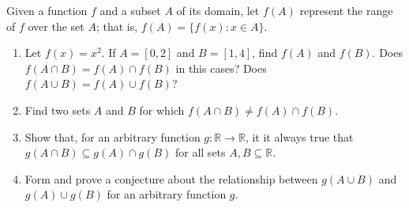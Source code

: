 \documentclass[class=understanding-analysis,crop=false]{standalone}
\begin{document}
\begin{exercise}
    \par Given a function $f$ and a subset $A$ of its domain, let $f(A)$ represent the range of $f$ over the set $A$; that is, $f(A) = \{ f(x) : x\in A \}$.
    \begin{enumerate}[label = (\alph*)]
        \item Let $f(x) = x^{2}$. If $A = [0, 2]$ and $B = [1, 4]$, find $f(A)$ and $f(B)$. Does $f(A\cap B) = f(A)\cap f(B)$ in this cases? Does $f(A\cup B) = f(A)\cup f(B)$?
        \item Find two sets $A$ and $B$ for which $f(A\cap B) \ne f(A)\cap f(B)$.
        \item Show that, for an arbitrary function $g: \mathbb{R}\to\mathbb{R}$, it it always true that $g(A\cap B) \subseteq g(A)\cap g(B)$ for all sets $A, B\subseteq\mathbb{R}$.
        \item Form and prove a conjecture about the relationship between $g(A\cup B)$ and $g(A)\cup g(B)$ for an arbitrary function $g$.
    \end{enumerate}
\end{exercise}
\end{document}
